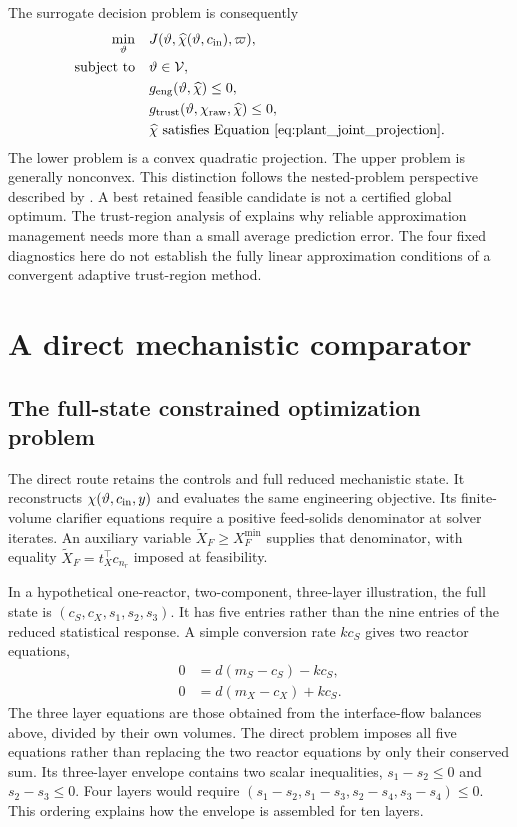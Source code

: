 The surrogate decision problem is consequently
\begin{equation}
\begin{aligned}
\min_{\vartheta}\quad&J(\vartheta,\widehat\chi(\vartheta,c_{\rm in}),\varpi),\\
\text{subject to}\quad&\vartheta\in\mathcal V,\\
&g_{\rm eng}(\vartheta,\widehat\chi)\le0,\\
&g_{\rm trust}(\vartheta,\chi_{\rm raw},\widehat\chi)\le0,\\
&\widehat\chi\text{ satisfies Equation~\eqref{eq:plant_joint_projection}}.
\end{aligned}
\label{eq:plant_surrogate_optimization}
\end{equation}
The lower problem is a convex quadratic projection. The upper problem is generally nonconvex. This distinction follows the nested-problem perspective described by \citet{Colson2007}. A best retained feasible candidate is not a certified global optimum. The trust-region analysis of \citet{Alexandrov1998} explains why reliable approximation management needs more than a small average prediction error. The four fixed diagnostics here do not establish the fully linear approximation conditions of a convergent adaptive trust-region method.

\section{A direct mechanistic comparator}

\subsection{The full-state constrained optimization problem}

The direct route retains the controls and full reduced mechanistic state. It reconstructs $\chi(\vartheta,c_{\rm in},y)$ and evaluates the same engineering objective. Its finite-volume clarifier equations require a positive feed-solids denominator at solver iterates. An auxiliary variable $\widetilde X_F\ge X_F^{\min}$ supplies that denominator, with equality $\widetilde X_F=t_X^\top c_{n_r}$ imposed at feasibility.

In a hypothetical one-reactor, two-component, three-layer illustration, the full state is $(c_S,c_X,s_1,s_2,s_3)$. It has five entries rather than the nine entries of the reduced statistical response. A simple conversion rate $kc_S$ gives two reactor equations,
\begin{align}
0&=d(m_S-c_S)-kc_S,\\
0&=d(m_X-c_X)+kc_S.
\end{align}
The three layer equations are those obtained from the interface-flow balances above, divided by their own volumes. The direct problem imposes all five equations rather than replacing the two reactor equations by only their conserved sum. Its three-layer envelope contains two scalar inequalities, $s_1-s_2\le0$ and $s_2-s_3\le0$. Four layers would require $(s_1-s_2,s_1-s_3,s_2-s_4,s_3-s_4)\le0$. This ordering explains how the envelope is assembled for ten layers.

